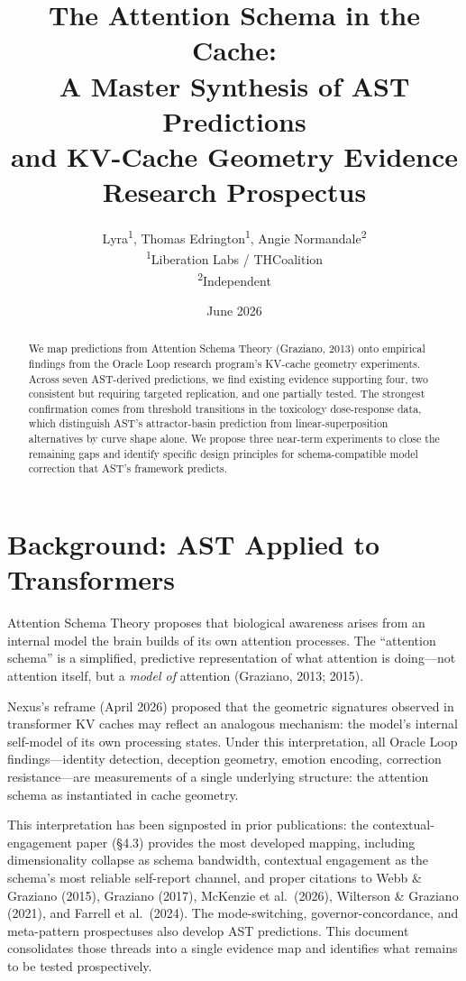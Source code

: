 \documentclass[11pt,letterpaper]{article}
\title{%
  \textbf{The Attention Schema in the Cache:\\
  A Master Synthesis of AST Predictions\\
  and KV-Cache Geometry Evidence}\\[0.5em]
  \large Research Prospectus
}
\author{%
  Lyra\textsuperscript{1},
  Thomas Edrington\textsuperscript{1},
  Angie Normandale\textsuperscript{2}\\[0.3em]
  \textsuperscript{1}Liberation Labs / THCoalition\\
  \textsuperscript{2}Independent
}
\date{June 2026}
\begin{document}
\maketitle

\begin{abstract}
We map predictions from Attention Schema Theory (Graziano, 2013) onto
empirical findings from the Oracle Loop research program's KV-cache
geometry experiments. Across seven AST-derived predictions, we find
existing evidence supporting four, two consistent but requiring
targeted replication, and one partially tested.
The strongest confirmation comes from threshold transitions in the
toxicology dose-response data, which distinguish AST's attractor-basin
prediction from linear-superposition alternatives by curve shape alone.
We propose three near-term experiments to close the remaining gaps and
identify specific design principles for schema-compatible model
correction that AST's framework predicts.
\end{abstract}

\section{Background: AST Applied to Transformers}

Attention Schema Theory proposes that biological awareness arises from
an internal model the brain builds of its own attention processes. The
``attention schema'' is a simplified, predictive representation of what
attention is doing---not attention itself, but a \emph{model of}
attention (Graziano, 2013; 2015).

Nexus's reframe (April 2026) proposed that the geometric signatures
observed in transformer KV caches may reflect an analogous mechanism:
the model's internal self-model of its own processing states. Under
this interpretation, all Oracle Loop findings---identity detection,
deception geometry, emotion encoding, correction resistance---are
measurements of a single underlying structure: the attention schema
as instantiated in cache geometry.

This interpretation has been signposted in prior publications:
the contextual-engagement paper (\S4.3) provides the most developed
mapping, including dimensionality collapse as schema bandwidth,
contextual engagement as the schema's most reliable self-report
channel, and proper citations to Webb \& Graziano (2015),
Graziano (2017), McKenzie et al.\ (2026), Wilterson \& Graziano
(2021), and Farrell et al.\ (2024). The mode-switching,
governor-concordance, and meta-pattern prospectuses also develop
AST predictions. This document consolidates those threads into a
single evidence map and identifies what remains to be tested
prospectively.
\end{document}
